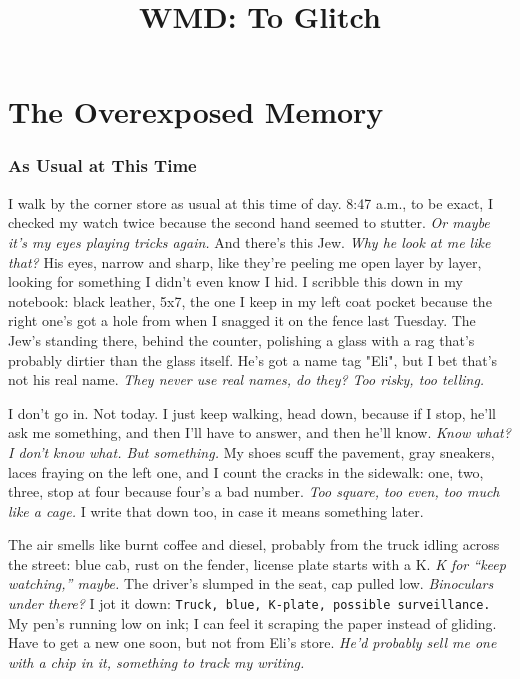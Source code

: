 \documentclass[12pt]{article}
\title{WMD: To Glitch}
\author{}
\date{}
\newcommand{\note}[1]{\texttt{#1}}
\begin{document}
\maketitle
\tableofcontents
\newpage

\part{The Overexposed Memory}

\section{As Usual at This Time}

I walk by the corner store as usual at this time of day. 8:47 a.m., to be exact, I checked my watch twice because the second hand seemed to stutter. \textit{Or maybe it’s my eyes playing tricks again.} And there’s this Jew. \textit{Why he look at me like that?} His eyes, narrow and sharp, like they’re peeling me open layer by layer, looking for something I didn’t even know I hid. I scribble this down in my notebook: black leather, 5x7, the one I keep in my left coat pocket because the right one’s got a hole from when I snagged it on the fence last Tuesday. The Jew’s standing there, behind the counter, polishing a glass with a rag that’s probably dirtier than the glass itself. He’s got a name tag \textnormal{"Eli"}, but I bet that’s not his real name. \textit{They never use real names, do they? Too risky, too telling.}

I don’t go in. Not today. I just keep walking, head down, because if I stop, he’ll ask me something, and then I’ll have to answer, and then he’ll know. \textit{Know what? I don’t know what. But something.} My shoes scuff the pavement, gray sneakers, laces fraying on the left one, and I count the cracks in the sidewalk: one, two, three, stop at four because four’s a bad number. \textit{Too square, too even, too much like a cage.} I write that down too, in case it means something later.

The air smells like burnt coffee and diesel, probably from the truck idling across the street: blue cab, rust on the fender, license plate starts with a K. \textit{K for “keep watching,” maybe.} The driver’s slumped in the seat, cap pulled low. \textit{Binoculars under there?} I jot it down: \note{Truck, blue, K-plate, possible surveillance.} My pen’s running low on ink; I can feel it scraping the paper instead of gliding. Have to get a new one soon, but not from \textnormal{Eli}’s store. \textit{He’d probably sell me one with a chip in it, something to track my writing.}
\end{document}
